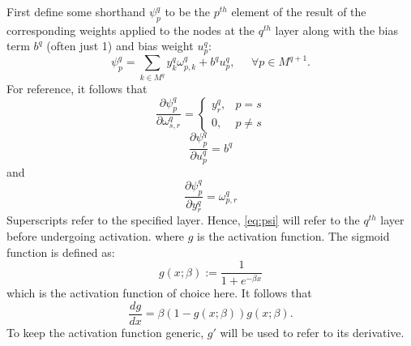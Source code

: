 \documentclass{article}
\begin{document}
First define some shorthand $\psi_p^q$ to be the $p^{th}$ element of the result of the corresponding weights applied to the nodes at the $q^{th}$ layer along with the bias term $b^q$ (often just 1) and bias weight $u_p^q$:
%
\begin{equation} \label{eq:psi}
\psi_p^q = \sum_{k \in M^q} y_k^q \omega_{p,k}^q + b^q u_p^q, \; \; \; \; \; \forall p \in M^{q+1}.
\end{equation}
%
For reference, it follows that
%
\begin{equation} \label{eq:dpsi_w}
\frac{\partial \psi_p^q}{\partial \omega_{s,r}^q} =
\begin{cases}
y_r^q, & p = s \\
0, & p \neq s
\end{cases}
\end{equation}
%
\begin{equation} \label{eq:dpsi_u}
\frac{\partial \psi_p^q}{\partial u_p^q} =
b^q
\end{equation}
%
and
%
\begin{equation} \label{eq:dpsi_y}
\frac{\partial \psi_p^q}{\partial y_r^q} =
\omega_{p,r}^q
\end{equation}
%
%
Superscripts refer to the specified layer.
Hence, \eqref{eq:psi} will refer to the $q^{th}$ layer before undergoing activation.
%
where $g$ is the activation function. The sigmoid function is defined as:
%
\begin{equation} \label{eq:g}
g(x;\beta) := \frac{1}{1 + e^{-\beta x}}
\end{equation}
%
which is the activation function of choice here.
It follows that
%
\begin{equation} \label{eq:gp}
\frac{d g}{d x} = \beta \left( 1 - g(x;\beta) \right) g(x; \beta).
\end{equation}
%
To keep the activation function generic, $g'$ will be used to refer to its derivative.
\end{document}
